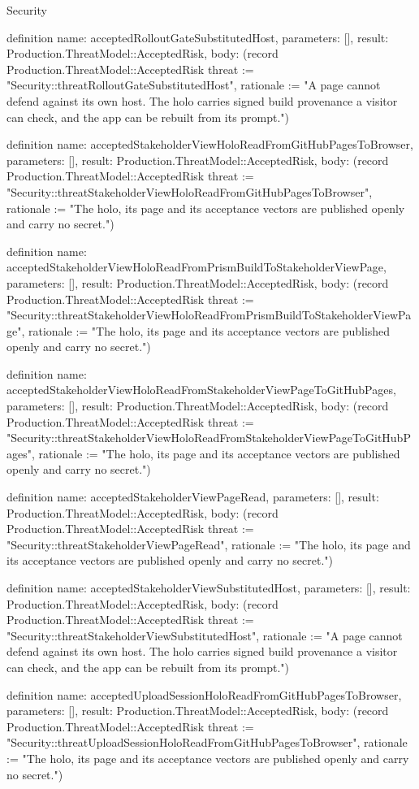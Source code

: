 \begin{lexlean}{Security}
\begin{semanticmodule}
definition{
  name: acceptedRolloutGateSubstitutedHost,
  parameters: [],
  result: Production.ThreatModel::AcceptedRisk,
  body: (record Production.ThreatModel::AcceptedRisk {threat := "Security::threatRolloutGateSubstitutedHost", rationale := "A page cannot defend against its own host. The holo carries signed build provenance a visitor can check, and the app can be rebuilt from its prompt."})
}

definition{
  name: acceptedStakeholderViewHoloReadFromGitHubPagesToBrowser,
  parameters: [],
  result: Production.ThreatModel::AcceptedRisk,
  body: (record Production.ThreatModel::AcceptedRisk {threat := "Security::threatStakeholderViewHoloReadFromGitHubPagesToBrowser", rationale := "The holo, its page and its acceptance vectors are published openly and carry no secret."})
}

definition{
  name: acceptedStakeholderViewHoloReadFromPrismBuildToStakeholderViewPage,
  parameters: [],
  result: Production.ThreatModel::AcceptedRisk,
  body: (record Production.ThreatModel::AcceptedRisk {threat := "Security::threatStakeholderViewHoloReadFromPrismBuildToStakeholderViewPage", rationale := "The holo, its page and its acceptance vectors are published openly and carry no secret."})
}

definition{
  name: acceptedStakeholderViewHoloReadFromStakeholderViewPageToGitHubPages,
  parameters: [],
  result: Production.ThreatModel::AcceptedRisk,
  body: (record Production.ThreatModel::AcceptedRisk {threat := "Security::threatStakeholderViewHoloReadFromStakeholderViewPageToGitHubPages", rationale := "The holo, its page and its acceptance vectors are published openly and carry no secret."})
}

definition{
  name: acceptedStakeholderViewPageRead,
  parameters: [],
  result: Production.ThreatModel::AcceptedRisk,
  body: (record Production.ThreatModel::AcceptedRisk {threat := "Security::threatStakeholderViewPageRead", rationale := "The holo, its page and its acceptance vectors are published openly and carry no secret."})
}

definition{
  name: acceptedStakeholderViewSubstitutedHost,
  parameters: [],
  result: Production.ThreatModel::AcceptedRisk,
  body: (record Production.ThreatModel::AcceptedRisk {threat := "Security::threatStakeholderViewSubstitutedHost", rationale := "A page cannot defend against its own host. The holo carries signed build provenance a visitor can check, and the app can be rebuilt from its prompt."})
}

definition{
  name: acceptedUploadSessionHoloReadFromGitHubPagesToBrowser,
  parameters: [],
  result: Production.ThreatModel::AcceptedRisk,
  body: (record Production.ThreatModel::AcceptedRisk {threat := "Security::threatUploadSessionHoloReadFromGitHubPagesToBrowser", rationale := "The holo, its page and its acceptance vectors are published openly and carry no secret."})
}


\end{semanticmodule}
\end{lexlean}
